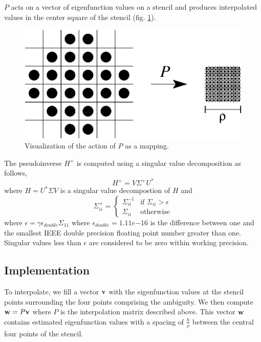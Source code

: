 \documentclass{report}
\begin{document}
$P$ acts on a vector of eigenfunction values on a stencil and produces interpolated values in the center square of the stencil (fig. \ref{fig:upsample_action}).

\begin{figure}
  \begin{center}
    \includegraphics[width=\textwidth]{figs/stencils/upsample_action.eps}
    \caption{Visualization of the action of $P$ as a mapping.}
    \label{fig:upsample_action}
  \end{center}
\end{figure}

The pseudoinverse $H^{+}$ is computed using a singular value decomposition as follows,
\[
H^{+} = V \Sigma^{+} U^{*}
\]
where $H = U^{*} \Sigma V$ is a singular value decompostion of $H$ and
\[
\Sigma^{+}_{ii} =\begin{cases}
\Sigma_{ii}^{-1} & \text{if }\Sigma_{ii} > \epsilon\\
\Sigma_{ii} & \text{otherwise}
\end{cases}
\]
where $\epsilon = \gamma \epsilon_{double} \Sigma_{11}$ where $\epsilon_{double} = 1.11e{-16}$ is the difference between one and the smallest IEEE double precision floating point number greater than one. Singular values less than $\epsilon$ are considered to be zero within working precision.

\subsection{Implementation}
To interpolate, we fill a vector ${\bf v}$ with the eigenfunction values at the stencil points surrounding the four points comprising the ambiguity. We then compute ${\bf w} = P {\bf v}$ where $P$ is the interpolation matrix described above. This vector ${\bf w}$ contains estimated eigenfunction values with a spacing of $\frac{h}{\rho}$ between the central four points of the stencil.
\end{document}
